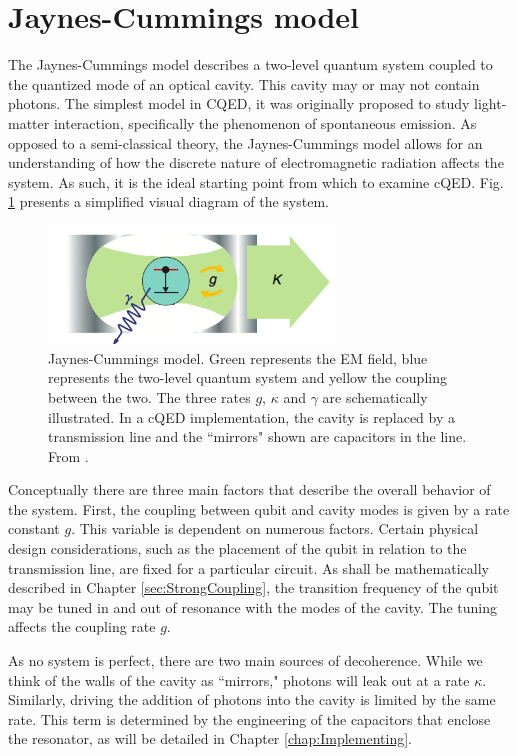 \documentclass[11 pt, oneside]{book} %
\begin{document}
\section{Jaynes-Cummings model}\label{sec:JC}
The Jaynes-Cummings model describes a two-level quantum system coupled to the quantized mode of an optical cavity. This cavity may or may not contain photons. The simplest model in CQED, it was originally proposed to study light-matter interaction, specifically the phenomenon of spontaneous emission. As opposed to a semi-classical theory, the Jaynes-Cummings model allows for an understanding of how the discrete nature of electromagnetic radiation affects the system. As such, it is the ideal starting point from which to examine cQED. Fig. \ref{fig:ToycQED} presents a simplified visual diagram of the system.

\begin{figure}[h] 
   \centering
   \includegraphics[width=3in]{Semba-Toy-cQED.png} 
   \caption[Jaynes Cummings model]{Jaynes-Cummings model. Green represents the EM field, blue represents the two-level quantum system and yellow the coupling between the two. The three rates $g$, $\kappa$ and $\gamma$ are schematically illustrated. In a cQED implementation, the cavity is replaced by a transmission line and the ``mirrors" shown are capacitors in the line. From \cite{Semba}.}
   \label{fig:ToycQED}
\end{figure}

Conceptually there are three main factors that describe the overall behavior of the system. First, the coupling between qubit and cavity modes is given by a rate constant $g$. This variable is dependent on numerous factors. Certain physical design considerations, such as the placement of the qubit in relation to the transmission line, are fixed for a particular circuit. As shall be mathematically described in Chapter \ref{sec:StrongCoupling}, the transition frequency of the qubit may be tuned in and out of resonance with the modes of the cavity. The tuning affects the coupling rate $g$. 

As no system is perfect, there are two main sources of decoherence. While we think of the walls of the cavity as ``mirrors," photons will leak out at a rate $\kappa$. Similarly, driving the addition of photons into the cavity is limited by the same rate. This term is determined by the engineering of the capacitors that enclose the resonator, as will be detailed in Chapter \ref{chap:Implementing}. 
\end{document}
